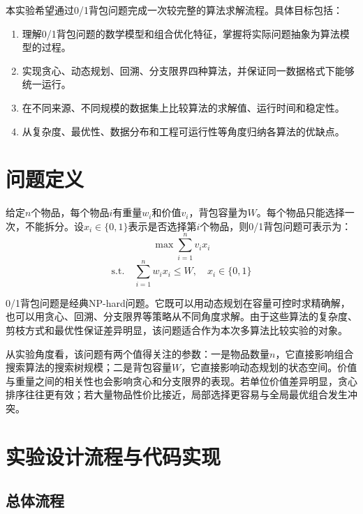 \documentclass[10.5pt,a4paper,fontset=none]{ctexart}
\begin{document}
本实验希望通过0/1背包问题完成一次较完整的算法求解流程。具体目标包括：
\begin{enumerate}
  \item 理解0/1背包问题的数学模型和组合优化特征，掌握将实际问题抽象为算法模型的过程。
  \item 实现贪心、动态规划、回溯、分支限界四种算法，并保证同一数据格式下能够统一运行。
  \item 在不同来源、不同规模的数据集上比较算法的求解值、运行时间和稳定性。
  \item 从复杂度、最优性、数据分布和工程可运行性等角度归纳各算法的优缺点。
\end{enumerate}


\section{问题定义}

给定$n$个物品，每个物品$i$有重量$w_i$和价值$v_i$，背包容量为$W$。每个物品只能选择一次，不能拆分。设$x_i \in \{0,1\}$表示是否选择第$i$个物品，则0/1背包问题可表示为：
\begin{equation}
\max \sum_{i=1}^{n} v_i x_i
\end{equation}
\begin{equation}
\text{s.t.} \quad \sum_{i=1}^{n} w_i x_i \leq W,\quad x_i \in \{0,1\}
\end{equation}

0/1背包问题是经典NP-hard问题。它既可以用动态规划在容量可控时求精确解，也可以用贪心、回溯、分支限界等策略从不同角度求解。由于这些算法的复杂度、剪枝方式和最优性保证差异明显，该问题适合作为本次多算法比较实验的对象。

从实验角度看，该问题有两个值得关注的参数：一是物品数量$n$，它直接影响组合搜索算法的搜索树规模；二是背包容量$W$，它直接影响动态规划的状态空间。价值与重量之间的相关性也会影响贪心和分支限界的表现。若单位价值差异明显，贪心排序往往更有效；若大量物品性价比接近，局部选择更容易与全局最优组合发生冲突。


\section{实验设计流程与代码实现}

\subsection{总体流程}
\end{document}
